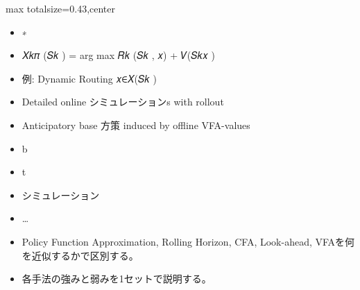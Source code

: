\clearpage
{}
\begin{minipage}[t]{0.405\textwidth}
\begin{adjustbox}{max totalsize={\textwidth}{0.43\textheight},center}
\begin{minipage}{\textwidth}\scriptsize
{}\begin{itemize}
\item ∗
\item 𝑋𝑘𝜋 (𝑆𝑘 ) = arg max 𝑅𝑘 (𝑆𝑘 , 𝑥) + 𝑉(𝑆𝑘𝑥 )
\item 例: Dynamic Routing 𝑥∈𝑋(𝑆𝑘 )
\item Detailed online シミュレーションs with rollout
\item Anticipatory base 方策 induced by offline VFA-values
\item b
\item t
\item シミュレーション
\item …
\end{itemize}\begin{itemize}
\item Policy Function Approximation, Rolling Horizon, CFA, Look-ahead, VFAを何を近似するかで区別する。
\item 各手法の強みと弱みを1セットで説明する。
\end{itemize}
\end{minipage}
\end{adjustbox}
\end{minipage}\hfill
